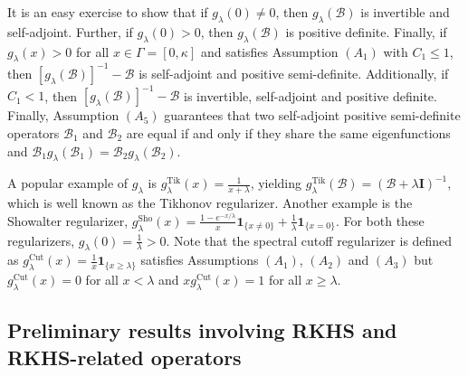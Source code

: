 \documentclass{article} %
\newcommand{\gl}{g_{\lambda}}
\newcommand{\glTik}{\gl^{\operatorname{Tik}}}
\newcommand{\glSh}{\gl^{\operatorname{Sho}}}
\newcommand{\glCut}{\gl^{\operatorname{Cut}}}
\newcommand{\SpectralAssumptionone}{A_{1}}
\newcommand{\SpectralAssumptiontwo}{A_{2}}
\newcommand{\SpectralAssumptionthree}{A_{3}}
\newcommand{\SpectralAssumptionfive}{A_{5}}
\theoremstyle{plain}
\begin{document}
It is an easy exercise to show that if $\gl(0) \neq 0$, then $\gl(\mathcal{B})$ is invertible and self-adjoint. Further, if $\gl(0) > 0$, then $\gl(\mathcal{B})$ is positive definite. Finally, if $\gl(x) > 0$ for all $x \in \Gamma = [0, \kappa]$ and satisfies Assumption \hyperref[Assumption Spectral Regularizer A1]{$(\SpectralAssumptionone)$} with $C_1 \leq 1$, then $[\gl(\mathcal{B})]^{-1} - \mathcal{B}$ is self-adjoint and positive semi-definite. Additionally, if $C_1 < 1$, then $[\gl(\mathcal{B})]^{-1} - \mathcal{B}$ is invertible, self-adjoint and positive definite. Finally, Assumption \hyperref[Assumption Spectral Regularizer 5]{$(\SpectralAssumptionfive)$} guarantees that two self-adjoint positive semi-definite operators $\mathcal{B}_1$ and $\mathcal{B}_2$ are equal if and only if they share the same eigenfunctions and $\mathcal{B}_1 g_{\lambda}(\mathcal{B}_1) = \mathcal{B}_2 g_{\lambda}(\mathcal{B}_2)$.

A popular example of $\gl$ is $\glTik(x)=\frac{1}{x+\lambda}$, yielding $\glTik(\mathcal{B})=(\mathcal{B}+\lambda \boldsymbol{I})^{-1}$, which is well known as the Tikhonov regularizer. Another example is the Showalter regularizer, $\glSh(x)=\frac{1-e^{-x / \lambda}}{x} \mathbf{1}_{\{x \neq 0\}}+\frac{1}{\lambda} \mathbf{1}_{\{x=0\}}$. For both these regularizers, $\gl(0) = \frac{1}{\lambda} > 0$. Note that the spectral cutoff regularizer is defined as $\glCut(x)=\frac{1}{x} \mathbf{1}_{\{x \geq \lambda\}}$ satisfies Assumptions \hyperref[Assumption Spectral Regularizer A1]{$(\SpectralAssumptionone)$}, \hyperref[Assumption Spectral Regularizer A2]{$(\SpectralAssumptiontwo)$} and \hyperref[Assumption Spectral Regularizer A3]{$(\SpectralAssumptionthree)$} but $\glCut(x)=0$ for all $x < \lambda$ and $x \glCut(x) = 1$ for all $x \geq \lambda$.

\subsection{Preliminary results involving RKHS and RKHS-related operators}
\end{document}
